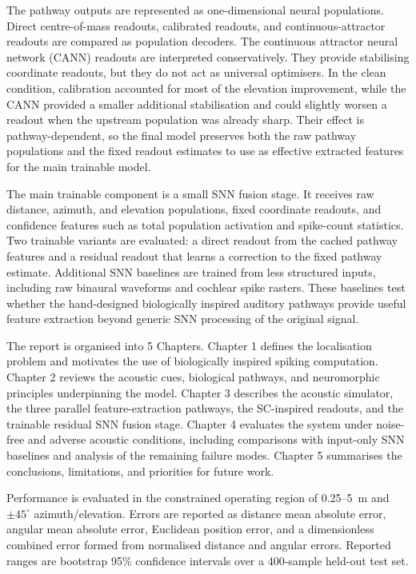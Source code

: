 The pathway outputs are represented as one-dimensional neural populations. Direct centre-of-mass readouts, calibrated readouts, and continuous-attractor readouts are compared as population decoders. The continuous attractor neural network (CANN) readouts are interpreted conservatively. They provide stabilising coordinate readouts, but they do not act as universal optimisers. In the clean condition, calibration accounted for most of the elevation improvement, while the CANN provided a smaller additional stabilisation and could slightly worsen a readout when the upstream population was already sharp. Their effect is pathway-dependent, so the final model preserves both the raw pathway populations and the fixed readout estimates to use as effective extracted features for the main trainable model.

The main trainable component is a small SNN fusion stage. It receives raw distance, azimuth, and elevation populations, fixed coordinate readouts, and confidence features such as total population activation and spike-count statistics. Two trainable variants are evaluated: a direct readout from the cached pathway features and a residual readout that learns a correction to the fixed pathway estimate. Additional SNN baselines are trained from less structured inputs, including raw binaural waveforms and cochlear spike rasters. These baselines test whether the hand-designed biologically inspired auditory pathways provide useful feature extraction beyond generic SNN processing of the original signal.

The report is organised into 5 Chapters. Chapter 1 defines the localisation problem and motivates the use of biologically inspired spiking computation. Chapter 2 reviews the acoustic cues, biological pathways, and neuromorphic principles underpinning the model. Chapter 3 describes the acoustic simulator, the three parallel feature-extraction pathways, the SC-inspired readouts, and the trainable residual SNN fusion stage. Chapter 4 evaluates the system under noise-free and adverse acoustic conditions, including comparisons with input-only SNN baselines and analysis of the remaining failure modes. Chapter 5 summarises the conclusions, limitations, and priorities for future work.

Performance is evaluated in the constrained operating region of 0.25--5~m and $\pm45^\circ$ azimuth/elevation. Errors are reported as distance mean absolute error, angular mean absolute error, Euclidean position error, and a dimensionless combined error formed from normalised distance and angular errors. Reported ranges are bootstrap 95\% confidence intervals over a 400-sample held-out test set.

